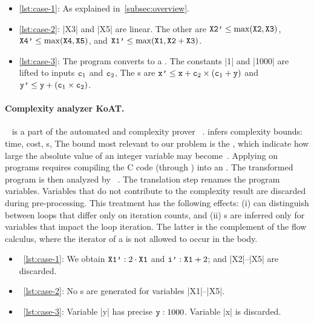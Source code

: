 \begin{itemize}

\item \autoref{lst:case-1}: As explained in~\autoref{subsec:overview}.

\item \autoref{lst:case-2}: \pr|X3| and \pr|X5| are linear.
The other are
\(\prm{X2'}\leq\max(\prm{X2},\prm{X3})\),
\( \prm{X4'}\leq\max(\prm{X4},\prm{X5})\), and
\(\prm{X1'}\leq\max(\prm{X1},\prm{X2}+\prm{X3})\).

\item \autoref{lst:case-3}: The program converts to a . The
constants \pr|1| and \pr|1000| are lifted to inputs \(\prm{c}_1\) and
\(\prm{c}_2\), \resp The s are
\(\prm{x'}\leq\prm{x}+\prm{c}_2\times(\prm{c}_1 + \prm{y})\) and
\(\prm{y'}\leq\prm{y}+(\prm{c}_1\times\prm{c}_2)\).

\end{itemize}

\paragraph{Complexity analyzer KoAT.}
~\cite{koat} is a part of the automated  and
complexity prover ~\cite{giesl2016}.  infers complexity
bounds: time, cost, s, \etc The bound
most relevant to our problem is the \emph{}, which indicate how
large the absolute value of an integer variable may become~\cite{lommen2023}.
Applying  on  programs requires compiling the C code (through
) into an . The transformed program is
then analyzed by ~\cite{giesl2022}. The translation step renames the
program variables. Variables that do not contribute to the complexity result are
discarded during pre-processing. This treatment has the following effects: (i)
 can distinguish between loops that differ only on iteration counts,
and (ii) s are inferred only for variables that impact the loop
iteration. The latter is the complement of the flow
calculus, where the iterator of a  is not
allowed to occur in the body.

\begin{itemize}
\item~\autoref{lst:case-1}: We obtain \(\prm{X1'} : 2 \cdot \prm{X1}\) and
\(\prm{i'}: \prm{X1}+ 2\); and \pr|X2|--\pr|X5| are discarded.

\item~\autoref{lst:case-2}: No s are generated for variables
\pr|X1|--\pr|X5|.

\item~\autoref{lst:case-3}: Variable \pr|y| has precise 
\(\prm{y}: 1000\). Variable \pr|x| is discarded.
\end{itemize}

